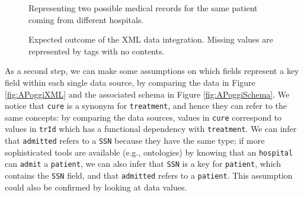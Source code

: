 \begin{figure}[!p]
	\begin{minipage}[t]{\textwidth}
		
		\label{fig:ManolescuXML}
	\end{minipage}
	
	\begin{minipage}[t]{\textwidth}
		
		\label{fig:APoggiXML}
	\end{minipage}
	
	\caption{Representing two possible medical records for the same patient  coming from different hospitals.}
	\label{fig:XMLIntegration}
\end{figure}
\begin{figure}[!p]
	
	\caption{Expected outcome of the XML data integration. Missing values are represented by tags with no contents.}
	\label{fig:XMLDataMergeAfterAlignment}
\end{figure}
As a second step, we can make some assumptions on which fields  represent a key field within each single data source, by comparing the data in Figure \vref{fig:APoggiXML} and the associated schema in Figure \ref{fig:APoggiSchema}. We notice that \texttt{cure} is a synonym for \texttt{treatment}, and hence they can refer to the same concepts:  by comparing the  data sources,  values in \texttt{cure} correspond to values in \texttt{trId} which has a functional dependency with \texttt{treatment}. We can infer that \texttt{admitted} refers to a \texttt{SSN} because they have the same type; if more sophisticated tools are available (e.g., ontologies) by knowing that an \texttt{hospital} can \texttt{admit} a \texttt{patient},  we can also infer that \texttt{SSN} is a key for \texttt{patient}, which contains the \texttt{SSN} field, and that \texttt{admitted} refers to a \texttt{patient}. This assumption could also be confirmed by looking at data values.





